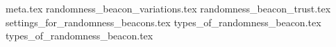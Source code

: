 {meta.tex}
{randomness_beacon_variations.tex}
{randomness_beacon_trust.tex}
{settings_for_randomness_beacons.tex}
{types_of_randomness_beacon.tex}
{types_of_randomness_beacon.tex}
